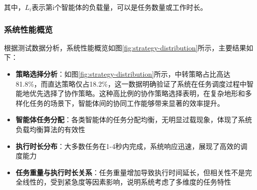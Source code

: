 \documentclass[12pt,a4paper]{article}
\begin{document}
其中，$L_i$表示第i个智能体的负载量，可以是任务数量或工作时长。

\subsubsection{系统性能概览}

根据测试数据分析，系统性能概览如图\ref{fig:strategy-distribution}所示，主要结果如下：

\begin{itemize}
    \item \textbf{策略选择分析}：如图\ref{fig:strategy-distribution}所示，中转策略占比高达81.8\%，而直达策略仅占18.2\%，这一数据明确验证了系统在任务调度过程中智能地优先选择了协作策略。这种高比例的协作策略选择表明，在复杂地形和多样化任务的场景下，智能体间的协同工作能够带来显著的效率提升。
    \item \textbf{智能体任务分配}：各类智能体的任务分配均衡，无明显过载现象，体现了系统负载均衡算法的有效性
    \item \textbf{执行时长分布}：大多数任务在1-4秒内完成，系统响应迅速，展现了高效的调度能力
    \item \textbf{任务重量与执行时长关系}：任务重量增加导致执行时间延长，但相关性不是完全线性的，受到紧急度等因素影响，说明系统考虑了多维度的任务特性
\end{itemize}
\end{document}
